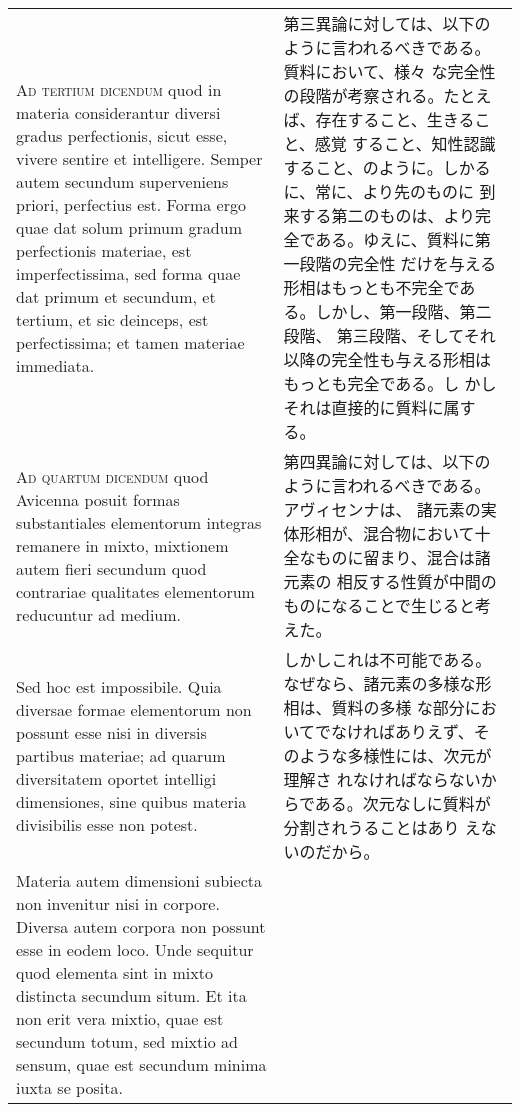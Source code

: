 \documentclass[paper=a4paper,fontsize=10pt,jafontsize=9pt,titlepage]{jlreq}
\begin{document}
\begin{longtable}{p{21em}p{21em}}
\\

{\scshape Ad tertium dicendum} quod in materia considerantur diversi
gradus perfectionis, sicut esse, vivere sentire et intelligere. Semper
autem secundum superveniens priori, perfectius est. Forma ergo quae
dat solum primum gradum perfectionis materiae, est imperfectissima,
sed forma quae dat primum et secundum, et tertium, et sic deinceps,
est perfectissima; et tamen materiae immediata.

&

 第三異論に対しては、以下のように言われるべきである。質料において、様々
 な完全性の段階が考察される。たとえば、存在すること、生きること、感覚
 すること、知性認識すること、のように。しかるに、常に、より先のものに
 到来する第二のものは、より完全である。ゆえに、質料に第一段階の完全性
 だけを与える形相はもっとも不完全である。しかし、第一段階、第二段階、
 第三段階、そしてそれ以降の完全性も与える形相はもっとも完全である。し
 かしそれは直接的に質料に属する。
 
\\


{\scshape Ad quartum dicendum} quod Avicenna posuit formas
substantiales elementorum integras remanere in mixto, mixtionem autem
fieri secundum quod contrariae qualitates elementorum reducuntur ad
 medium.


&

 第四異論に対しては、以下のように言われるべきである。アヴィセンナは、
 諸元素の実体形相が、混合物において十全なものに留まり、混合は諸元素の
 相反する性質が中間のものになることで生じると考えた。
 
\\


 Sed hoc est impossibile. Quia diversae formae elementorum non
possunt esse nisi in diversis partibus materiae; ad quarum
diversitatem oportet intelligi dimensiones, sine quibus materia
 divisibilis esse non potest.
 
&

 しかしこれは不可能である。なぜなら、諸元素の多様な形相は、質料の多様
 な部分においてでなければありえず、そのような多様性には、次元が理解さ
 れなければならないからである。次元なしに質料が分割されうることはあり
 えないのだから。

 
\\

Materia autem dimensioni subiecta non invenitur nisi in
corpore. Diversa autem corpora non possunt esse in eodem loco. Unde
sequitur quod elementa sint in mixto distincta secundum situm. Et ita
non erit vera mixtio, quae est secundum totum, sed mixtio ad sensum,
quae est secundum minima iuxta se posita.


\end{longtable}
\end{document}
